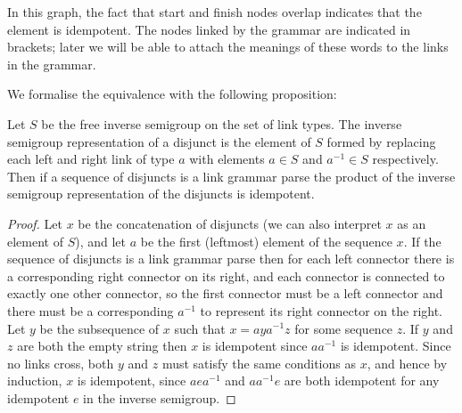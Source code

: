 In this graph, the fact that start and finish nodes overlap indicates that the element is idempotent. The nodes linked by the grammar are indicated in brackets; later we will be able to attach the meanings of these words to the links in the grammar.

We formalise the equivalence with the following proposition:
\begin{prop}
Let $S$ be the free inverse semigroup on the set of link types. The inverse semigroup representation of a disjunct is the element of $S$ formed by replacing each left and right link of type $a$ with elements $a \in S$ and $a^{-1} \in S$ respectively. Then if a sequence of disjuncts is a link grammar parse the product of the inverse semigroup representation of the disjuncts is idempotent.
\end{prop}
\begin{proof}
Let $x$ be the concatenation of disjuncts (we can also interpret $x$ as an element of $S$), and let $a$ be the first (leftmost) element of the sequence $x$. If the sequence of disjuncts is a link grammar parse then for each left connector there is a corresponding right connector on its right, and each connector is connected to exactly one other connector, so the first connector must be a left connector and there must be a corresponding $a^{-1}$ to represent its right connector on the right. Let $y$ be the subsequence of $x$ such that $x = aya^{-1}z$ for some sequence $z$. If $y$ and $z$ are both the empty string then $x$ is idempotent since $aa^{-1}$ is idempotent. Since no links cross, both $y$ and $z$ must satisfy the same conditions as $x$, and hence by induction, $x$ is idempotent, since $aea^{-1}$ and $aa^{-1}e$ are both idempotent for any idempotent $e$ in the inverse semigroup.
\end{proof}

